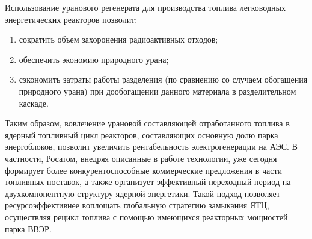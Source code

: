 
Использование уранового регенерата для производства топлива легководных энергетических реакторов позволит: 
\begin{enumerate}
  \item сократить объем захоронения радиоактивных отходов; 
  \item обеспечить экономию природного урана;
  \item сэкономить затраты работы разделения (по сравнению со случаем обогащения природного урана) при дообогащении данного материала в разделительном каскаде. 
\end{enumerate}
Таким образом, вовлечение урановой составляющей отработанного топлива в ядерный топливный цикл реакторов, составляющих основную долю парка энергоблоков, позволит увеличить рентабельность электрогенерации на АЭС. В частности, Росатом, внедряя описанные в работе технологии, уже сегодня формирует более конкурентоспособные коммерческие предложения в части топливных поставок, а также организует эффективный переходный период на двухкомпонентную структуру ядерной энергетики. Такой подход позволяет ресурсоэффективнее воплощать глобальную стратегию замыкания ЯТЦ, осуществляя рецикл топлива с помощью имеющихся реакторных мощностей парка ВВЭР.


